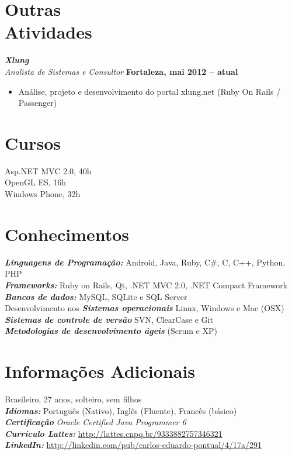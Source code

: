 \documentclass[margin, 10pt]{res} %
\begin{document}
\begin{resume}

\section{Outras \\ Atividades}

{\sl\bf Xlung} \\
{\sl Analista de Sistemas e Consultor} \hfill {\bf Fortaleza, mai 2012 -- atual}
\begin{itemize} \itemsep -2pt 
\item Análise, projeto e desenvolvimento do portal xlung.net (Ruby On Rails / Passenger)
\end{itemize} 

\section{Cursos}
Asp.NET MVC 2.0, 40h \\ 
OpenGL ES, 16h \\ 
Windows Phone, 32h


\section{Conhecimentos}
{\sl\bf Linguagens de Programação:}  Android, Java, Ruby, C\#, C, C++, Python, PHP \\
{\sl\bf Frameworks:} Ruby on Rails, Qt, .NET MVC 2.0, .NET Compact Framework \\
{\sl\bf Bancos de dados:} MySQL, SQLite e SQL Server \\
Desenvolvimento nos {\sl\bf Sistemas operacionais} Linux, Windows e Mac (OSX) \\
{\sl\bf Sistemas de controle de versão} SVN, ClearCase e Git \\
{\sl\bf Metodologias de desenvolvimento ágeis} (Scrum e XP)  \\

\section {Informações Adicionais}
Brasileiro, 27 anos, solteiro, sem filhos \\
{\sl\bf Idiomas:} Português (Nativo), Inglês (Fluente), Francês (básico) \\
{\sl\bf Certificação} {\sl Oracle Certified Java Programmer 6} \\
{\sl\bf Curriculo Lattes:} \url{http://lattes.cnpq.br/9333882757346321} \\
{\sl\bf LinkedIn:} \url{http://linkedin.com/pub/carlos-eduardo-pontual/4/17a/291} \\


\end{resume}
\end{document}
